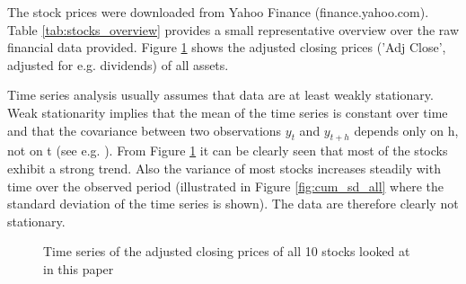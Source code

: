 The stock prices were downloaded from Yahoo Finance (finance.yahoo.com). Table \ref{tab:stocks_overview} provides a small representative overview over the raw financial data provided. Figure \ref{fig:Daily Stock Prices for all Stocks in the Data Set} shows the adjusted closing prices ('Adj Close', adjusted for e.g. dividends) of all assets. 

\begin{table}[h!]
    \centering
    \begin{adjustbox}{width = 0.95\linewidth}
    \setlength{\tabcolsep}{15pt}
    
    \end{adjustbox}
    \caption{}
    \label{tab:stocks_overview}
\end{table}{}

Time series analysis usually assumes that data are at least weakly stationary. Weak stationarity implies that the mean of the time series is constant over time and that the covariance between two observations $y_t$ and $y_{t+h}$ depends only on h, not on t (see e.g. \cite{shumway_time_2011}). From Figure \ref{fig:Daily Stock Prices for all Stocks in the Data Set} it can be clearly seen that most of the stocks exhibit a strong trend. Also the variance of most stocks increases steadily with time over the observed period (illustrated in Figure \ref{fig:cum_sd_all} where the standard deviation of the time series is shown). The data are therefore clearly not stationary. %

\begin{figure}[h!]
    \centering
    \begin{adjustbox}{width=.75\textwidth,center}
    
    \end{adjustbox}  
    \caption{Time series of the adjusted closing prices of all 10 stocks looked at in this paper}
    \label{fig:Daily Stock Prices for all Stocks in the Data Set}
\end{figure}{}

